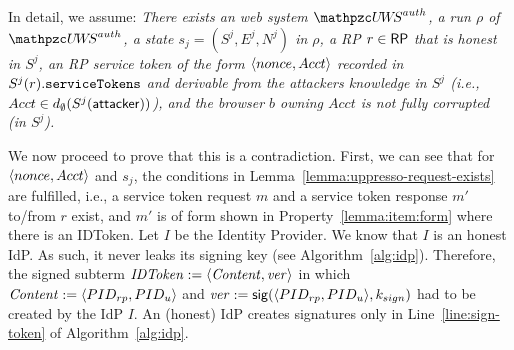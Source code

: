  
  In detail, we assume: \emph{There exists an \uppresso web 
  system $\uppressoauthwebsystem$, a run $\rho$ of 
  $\uppressoauthwebsystem$, a state $s_j = (S^j, E^j, N^j)$ 
  in $\rho$, a RP $r\in \mathsf{RP}$ that is honest in $S^j$, 
  an RP service token of the form $\langle {{}nonce, Acct} \rangle$
  recorded in $S^j(r).\mathtt{serviceTokens}$ and derivable from 
  the attackers knowledge in $S^j$ (i.e., $Acct \in
  d_{\emptyset}(S^j(\mathsf{attacker}))$), and the browser $b$ 
  owning $Acct$ is not fully corrupted (in $S^j$).}
  
  We now proceed to prove that this is a contradiction. 
  First, we can see that for $\langle nonce, Acct\rangle$ and $s_j$, 
  the conditions in Lemma~\ref{lemma:uppresso-request-exists} 
  are fulfilled, i.e., a service token request $m$ and a 
  service token response $m'$ to/from $r$ exist, and $m'$ is 
  of form shown in Property~\ref{lemma:item:form} where there is an IDToken.
  Let $I$ be the Identity Provider. 
  We know that $I$ is an honest IdP.
  As such, it never leaks its signing key (see Algorithm~\ref{alg:idp}). 
  Therefore, the signed subterm $\mathit{IDToken} := \langle {{}\mathit{Content}, \mathit{ver}} \rangle$ in which
  $\mathit{Content} := \langle {{}PID_{rp}, PID_u} \rangle$ and 
  $\mathit{ver} := \mathsf{sig}({\langle PID_{rp},PID_u\rangle},{k_{sign}})$ 
  had to be created by the IdP $I$. 
  An (honest) IdP creates signatures only in Line~\ref{line:sign-token} of Algorithm~\ref{alg:idp}.
  
